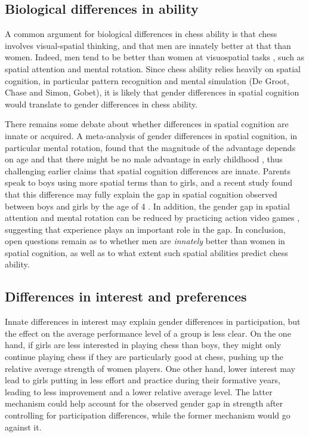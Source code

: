 \documentclass[9pt,twocolumn,twoside,lineno]{pnas-new}
\begin{document}
\subsection*{Biological differences in ability}
A common argument for biological differences in chess ability is that chess involves visual-spatial thinking, and that men are innately better at that than women. Indeed, men tend to be better than women at visuospatial tasks \cite{kimura1999sex, terlecki2005important, voyer1995magnitude}, such as spatial attention and mental rotation.  Since chess ability relies heavily on spatial cognition, in particular pattern recognition and mental simulation (De Groot, Chase and Simon, Gobet), it is likely that gender differences in spatial cognition would translate to gender differences in chess ability.

There remains some debate about whether differences in spatial cognition are innate or acquired. A meta-analysis of gender differences in spatial cognition, in particular mental rotation, found that the magnitude of the advantage depends on age and that there might be no male advantage in early childhood \cite{lauer2019development}, thus challenging earlier claims that spatial cognition differences are innate. Parents speak to boys using more spatial terms than to girls, and a recent study found that this difference may fully explain the gap in spatial cognition observed between boys and girls by the age of 4 \cite{pruden2017}. In addition, the gender gap in spatial attention and mental rotation can be reduced by practicing action video games \cite{feng2007playing}, suggesting that experience plays an important role in the gap. In conclusion, open questions remain as to whether men are {\it innately} better than women in spatial cognition, as well as to what extent such spatial abilities predict chess ability.

\subsection*{Differences in interest and preferences}
Innate differences in interest may explain gender differences in participation, but the effect on the average performance level of a group is less clear. On the one hand, if girls are less interested in playing chess than boys, they might only continue playing chess if they are particularly good at chess, pushing up the relative average strength of women players. One other hand, lower interest may lead to girls putting in less effort and practice during their formative years, leading to less improvement and a lower relative average level. The latter mechanism could help account for the observed gender gap in strength after controlling for participation differences, while the former mechanism would go against it.
\end{document}
